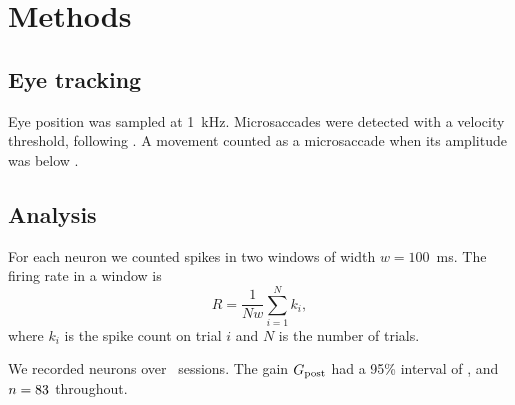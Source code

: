 \section{Methods}
\label{sec:methods}

\subsection{Eye tracking}

Eye position was sampled at 1~kHz. Microsaccades were detected with a
velocity threshold, following \textcite{engbert2003}. A movement counted as
a microsaccade when its amplitude was below .

\subsection{Analysis}

For each neuron we counted spikes in two windows of width $w = 100$~ms.
The firing rate in a window is
\[
  R = \frac{1}{N w} \sum_{i=1}^{N} k_i ,
\]
where $k_i$ is the spike count on trial $i$ and $N$ is the number of trials.

We recorded \NumNeurons{} neurons over \NumSessions\ sessions. The gain
$G_{\text{post}}$ had a 95\% interval of \GainCI, and $n = 83$ throughout.
